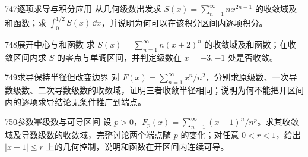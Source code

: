 \begin{exercise}{747}{逐项求导与积分应用}
从几何级数出发求 $S(x)=\sum_{n=1}^{\infty}nx^{2n-1}$ 的收敛域及和函数；求 $\int_0^{1/2}S(x)\,\dd x$，并说明为何可以在该积分区间内逐项积分。
\end{exercise}
\begin{exercise}{748}{展开中心与和函数}
求 $S(x)=\sum_{n=1}^{\infty}n(x+2)^n$ 的收敛域及和函数；在收敛区间内求 $S$ 的零点与单调区间，并判定级数在 $x=-3,-1$ 处是否收敛。
\end{exercise}
\begin{exercise}{749}{求导保持半径但改变边界}
对 $F(x)=\sum_{n=1}^{\infty}x^n/n^2$，分别求原级数、一次导数级数、二次导数级数的收敛域，证明三者收敛半径相同；说明为何不能把开区间内的逐项求导结论无条件推广到端点。
\end{exercise}
\begin{exercise}{750}{参数幂级数与可导区间}
设 $p>0$，$F_p(x)=\sum_{n=1}^{\infty}(x-1)^n/n^p$。求其收敛域及导数级数的收敛域，完整讨论两个端点随 $p$ 的变化；对任意 $0<r<1$，给出 $|x-1|\le r$ 上的几何控制，说明和函数在开区间内连续可导。
\end{exercise}

